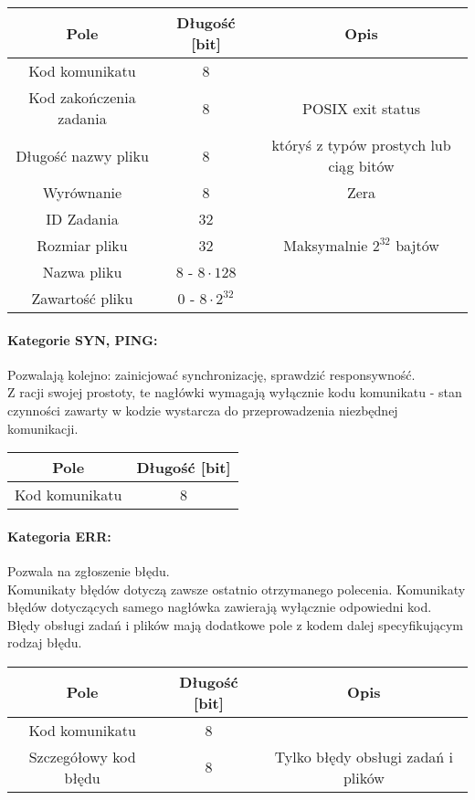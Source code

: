 \documentclass[10pt,a4paper]{article}
\begin{document}
            \begin{tabular}{ c | c | c }
			    \textbf{Pole} & \textbf{Długość [bit]} & \textbf{Opis} \\
			    \hline
			    Kod komunikatu & 8 & \\
			    Kod zakończenia zadania & 8 & POSIX exit status \\
			    Długość nazwy pliku & 8 & któryś z typów prostych lub ciąg bitów \\
			    Wyrównanie & 8 & Zera \\
			    ID Zadania & 32 & \\
			    Rozmiar pliku & 32 & Maksymalnie $ 2^{32} $ bajtów \\
			    Nazwa pliku & 8 - $ 8 \cdot 128 $ &  \\
			    Zawartość pliku & 0 - $ 8 \cdot 2^{32} $ &  \\
			\end{tabular}
			
			\paragraph{Kategorie SYN, PING:\\}
            Pozwalają kolejno: zainicjować synchronizację, sprawdzić responsywność. \\
            Z racji swojej prostoty, te nagłówki wymagają wyłącznie kodu komunikatu - stan czynności zawarty w kodzie wystarcza do przeprowadzenia niezbędnej komunikacji.
            
            \begin{tabular}{ c | c  }
			    \textbf{Pole} & \textbf{Długość [bit]} \\
			    \hline
			    Kod komunikatu & 8 \\
			\end{tabular}
						
			\paragraph{Kategoria ERR:\\}
            Pozwala na zgłoszenie błędu. \\
            Komunikaty błędów dotyczą zawsze ostatnio otrzymanego polecenia. Komunikaty błędów dotyczących samego nagłówka zawierają wyłącznie odpowiedni kod. Błędy obsługi zadań i plików mają dodatkowe pole z kodem dalej specyfikującym rodzaj błędu. 
            
            \begin{tabular}{ c | c | c  }
			    \textbf{Pole} & \textbf{Długość [bit]} & \textbf{Opis} \\
			    \hline
			    Kod komunikatu & 8 & \\
			    Szczegółowy kod błędu & 8 & Tylko błędy obsługi zadań i plików \\
			\end{tabular}
    
\end{document}
